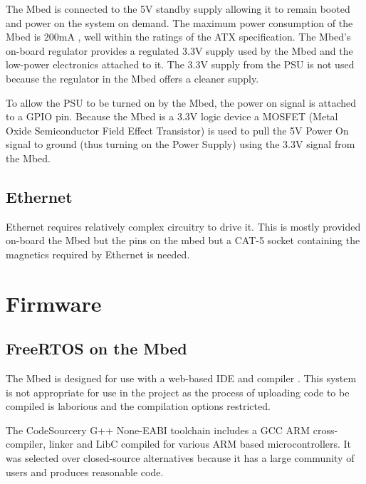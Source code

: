 			The Mbed is connected to the 5V standby supply allowing it to remain
			booted and power on the system on demand. The maximum power consumption
			of the Mbed is 200mA \cite{mbed}, well within the ratings of the ATX
			specification. The Mbed's on-board regulator provides a regulated 3.3V
			supply used by the Mbed and the low-power electronics attached to it.
			The 3.3V supply from the PSU is not used because the regulator in the
			Mbed offers a cleaner supply.
			
			To allow the PSU to be turned on by the Mbed, the power on signal is
			attached to a GPIO pin.  Because the Mbed is a 3.3V logic device a
			MOSFET (Metal Oxide Semiconductor Field Effect Transistor) is used to
			pull the 5V Power On signal to ground (thus turning on the Power Supply)
			using the 3.3V signal from the Mbed.
		
		\subsection{Ethernet}
			
			Ethernet requires relatively complex circuitry to drive it. This is
			mostly provided on-board the Mbed but the pins on the mbed but a
			CAT-5 socket containing the magnetics required by Ethernet is needed.
			
	
	\section{Firmware}
		
		
		\subsection{FreeRTOS on the Mbed}
			
			
			The Mbed is designed for use with a web-based IDE and compiler
			\cite{mbedcompiler}. This system is not appropriate for use in the project
			as the process of uploading code to be compiled is laborious and the
			compilation options restricted.
			
			The CodeSourcery G++ None-EABI toolchain includes a GCC ARM cross-compiler,
			linker and LibC compiled for various ARM based microcontrollers. It was
			selected over closed-source alternatives because it has a large community of
			users and produces reasonable code.
			
